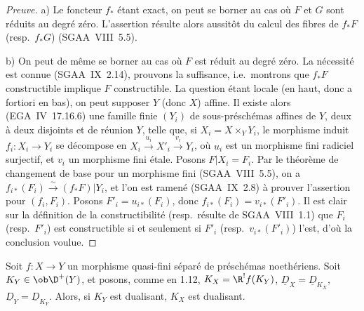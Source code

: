 \begin{proof}[Preuve]
a) Le foncteur $f_{*}$ étant exact, on peut se borner au cas où $F$ et $G$ sont réduits au degré zéro. L'assertion résulte alors aussitôt du calcul des fibres de $f_{*}F$ (resp.~$f_{*}G$) (SGAA~VIII~5.5).

b) On peut de même se borner au cas où $F$ est réduit au degré zéro. La nécessité est connue (SGAA~IX~2.14), prouvons la suffisance, i.e.~montrons que $f_{*}F$ constructible implique $F$ constructible. La question étant locale (en haut, donc a fortiori en bas), on peut supposer $Y$ (donc $X$) affine. Il existe alors (EGA~IV~17.16.6) une famille finie $(Y_i)$ de sous-préschémas affines de $Y$, deux à deux disjoints et de réunion $Y$, telle que, si $X_i = X \times_Y Y_i$, le morphisme induit $f_i : X_i \to Y_i$ se décompose en $X_i \xrightarrow{u_i} X'_i \xrightarrow{v_i} Y_i$, où $u_i$ est un morphisme fini radiciel surjectif, et $v_i$ un morphisme fini étale. Posons $F|X_i = F_i$. Par le théorème de changement de base pour un morphisme fini (SGAA~VIII~5.5), on a $f_{i*}(F_i) \xrightarrow{\sim} (f_{*}F)|Y_i$, et l'on est ramené (SGAA~IX~2.8) à prouver l'assertion pour $(f_i, F_i)$. Posons $F'_i = u_{i*}(F_i)$, donc $f_{i*}(F_i) = v_{i*}(F'_i)$. Il est clair sur la définition de la constructibilité (resp.~résulte de SGAA~VIII~1.1) que $F_i$ (resp.~$F'_i$) est constructible si et seulement si $F'_i$ (resp.~$v_{i*}(F'_i)$) l'est, d'où la conclusion voulue.
\end{proof}

\begin{corollary}
Soit $f : X \to Y$ un morphisme quasi-fini séparé de préschémas noethériens. Soit $K_Y \in \ob \D^{+}(Y)$, et posons, comme en 1.12, $K_X = \R^{!}f(K_Y)$, $\underline{D}_X = \underline{D}_{K_X}$, $\underline{D}_Y = \underline{D}_{K_Y}$. Alors, si $K_Y$ est dualisant, $K_X$ est dualisant.
\end{corollary}

